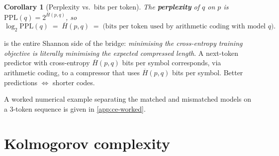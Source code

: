\documentclass[12pt,a4paper]{article}
\theoremstyle{plain}
\newtheorem{corollary}[theorem]{Corollary}
\theoremstyle{definition}
\begin{document}
\begin{corollary}[Perplexity vs.\ bits per token]
\label{cor:ppl}
The \textbf{perplexity} of $q$ on $p$ is
$\mathrm{PPL}(q) = 2^{\overline{H}(p,q)}$, so
\begin{equation}
  \log_2 \mathrm{PPL}(q) \;=\; \overline{H}(p,q)
  \;=\; \text{(bits per token used by arithmetic coding with model }q\text{)}.
  \label{eq:ppl-bpt}
\end{equation}
\end{corollary}

 is the entire Shannon side of the bridge:
\emph{minimising the cross-entropy training objective is literally
minimising the expected compressed length}.  A next-token predictor
with cross-entropy $\overline{H}(p,q)$ bits per symbol corresponds,
via arithmetic coding, to a compressor that uses $\overline{H}(p,q)$
bits per symbol.  Better predictions $\Leftrightarrow$ shorter codes.

A worked numerical example separating the matched and mismatched
models on a 3-token sequence is given in \cref{app:ce-worked}.

\section{Kolmogorov complexity}
\label{sec:kolmogorov}
\end{document}
